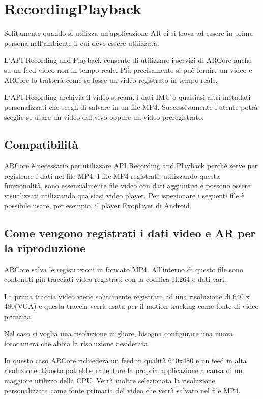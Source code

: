\documentclass[crop=false, class=book]{standalone}
\begin{document}
	\chapter{RecordingPlayback}
	
	Solitamente quando si utilizza un’applicazione AR ci si trova ad essere in prima persona nell’ambiente il cui deve essere utilizzata.
	
L'API Recording and Playback consente di utilizzare i servizi di ARCore anche su un feed video non in tempo reale. Più precisamente si può fornire un video e ARCore lo tratterà come se fosse un video registrato in tempo reale.

 L'API Recording archivia il video stream, i dati IMU o qualsiasi altri metadati personalizzati che scegli di salvare in un file MP4. Successivamente l’utente potrà sceglie se usare un video dal vivo oppure un video preregistrato.
 
 \section{Compatibilità}
 
 ARCore è necessario per utilizzare API Recording and Playback perché serve per registrare i dati nel file MP4. I file MP4 registrati, utilizzando questa funzionalità, sono essenzialmente file video con dati aggiuntivi  e possono essere visualizzati utilizzando qualsiasi video player. Per ispezionare i seguenti file è possibile usare, per esempio, il player Exoplayer di Android.
 
 \section{Come vengono registrati i dati video e AR per la riproduzione}
 
 ARCore salva le registrazioni in formato MP4. All’interno di questo file sono contenuti più tracciati video registrati con la codifica H.264 e dati vari.
 
La prima traccia video viene solitamente registrata ad una risoluzione di 640 x 480(VGA) e questa traccia verrà usata per il motion tracking come fonte di video primaria.

Nel caso si voglia una risoluzione migliore, bisogna configurare una nuova fotocamera che abbia la risoluzione desiderata.

In questo caso ARCore richiederà un feed in qualità 640x480 e un feed in alta risoluzione. Questo potrebbe rallentare la propria applicazione a causa di un maggiore utilizzo della CPU. Verrà inoltre selezionata la risoluzione personalizzata come fonte primaria del video che verrà salvato nel file MP4.
\end{document}
